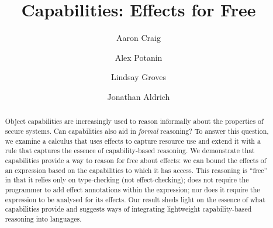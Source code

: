 \documentclass[runningheads]{llncs}
\begin{document}
\title{Capabilities: Effects for Free}

\author{Aaron Craig \and
  Alex Potanin \and
  Lindsay Groves \and
  Jonathan Aldrich}



\maketitle

\begin{abstract}
  Object capabilities are increasingly used to reason informally about
  the properties of secure systems. Can capabilities also aid in
  \textit{formal} reasoning? To answer this question, we examine a
  calculus that uses effects to capture resource use and extend it
  with a rule that captures the essence of capability-based
  reasoning. We demonstrate that capabilities provide a way to reason
  for free about effects: we can bound the effects of an expression
  based on the capabilities to which it has access.  This reasoning is
  ``free'' in that it relies only on type-checking (not
  effect-checking); does not require the programmer to add effect
  annotations within the expression; nor does it require the
  expression to be analysed for its effects. Our result sheds light on
  the essence of what capabilities provide and suggests ways of
  integrating lightweight capability-based reasoning into languages.

\end{abstract}






\vspace{-0.5cm}
\end{document}
